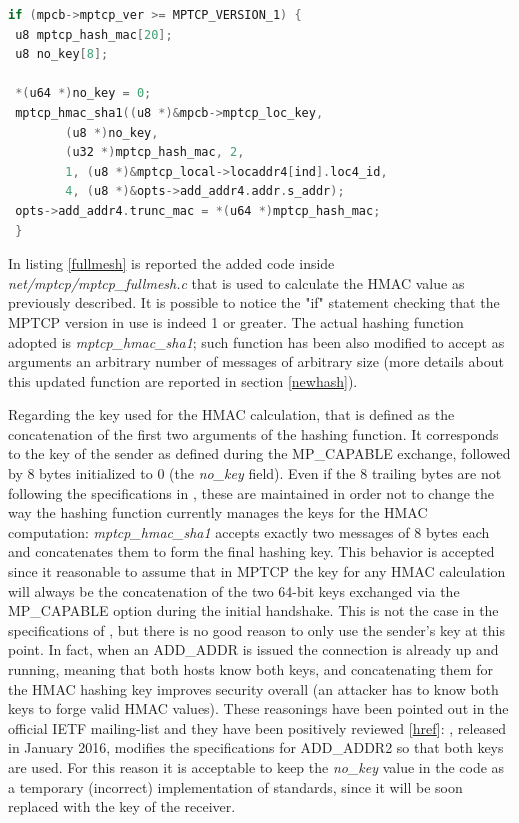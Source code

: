 \begin{lstlisting}[language=c, caption=\textit{New ADD\_ADDR HMAC calculation (outgoing packet)}, label=fullmesh]
 if (mpcb->mptcp_ver >= MPTCP_VERSION_1) {
 u8 mptcp_hash_mac[20];
 u8 no_key[8];

 *(u64 *)no_key = 0;
 mptcp_hmac_sha1((u8 *)&mpcb->mptcp_loc_key,
 		(u8 *)no_key,
		(u32 *)mptcp_hash_mac, 2,
		1, (u8 *)&mptcp_local->locaddr4[ind].loc4_id,
		4, (u8 *)&opts->add_addr4.addr.s_addr);
 opts->add_addr4.trunc_mac = *(u64 *)mptcp_hash_mac;
 }
\end{lstlisting}

In listing \ref{fullmesh} is reported the added code inside \textit{net/mptcp/mptcp\_fullmesh.c} that is used to calculate the HMAC value as previously described. It is possible to notice the "if" statement checking that the MPTCP version in use is indeed 1 or greater. The actual hashing function adopted is \textit{mptcp\_hmac\_sha1}; such function has been also modified to accept as arguments an arbitrary number of messages of arbitrary size (more details about this updated function are reported in section \ref{newhash}). 


Regarding the key used for the HMAC calculation, that is defined as the concatenation of the first two arguments of the hashing function. It corresponds to the key of the sender as defined during the MP\_CAPABLE exchange, followed by 8 bytes initialized to 0 (the \textit{no\_key} field). Even if the 8 trailing bytes are not following the specifications in , these are maintained in order not to change the way the hashing function currently manages the keys for the HMAC computation: \textit{mptcp\_hmac\_sha1} accepts exactly two messages of 8 bytes each and concatenates them to form the final hashing key. This behavior is accepted since it reasonable to assume that in MPTCP the key for any HMAC calculation will always be the concatenation of the two 64-bit keys exchanged via the MP\_CAPABLE option during the initial handshake. This is not the case in the specifications of , but there is no good reason to only use the sender's key at this point. In fact, when an ADD\_ADDR is issued the connection is already up and running, meaning that both hosts know both keys, and concatenating them for the HMAC hashing key improves security overall (an attacker has to know both keys to forge valid HMAC values). These reasonings have been pointed out in the official IETF mailing-list and they have been positively reviewed [\href{https://mailarchive.ietf.org/arch/search/?email_list=multipathtcp&q=RFC6824bis-04+ADD_ADDR2+comments}{href}]: , released in January 2016, modifies the specifications for ADD\_ADDR2 so that both keys are used. For this reason it is acceptable to keep the \textit{no\_key} value in the code as a temporary (incorrect) implementation of  standards, since it will be soon replaced with the key of the receiver. 

